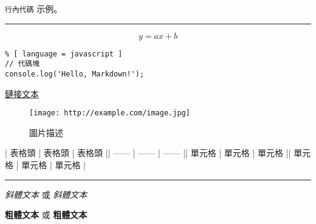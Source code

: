 \lstinline{行內代碼} 示例。

\vspace{5pt}
\hrule
\vspace{6pt}

\begin{equation}
y = ax+b
\end{equation}

\begin{lstlisting}% [ language = javascript ]
// 代碼塊
console.log('Hello, Markdown!');
\end{lstlisting}

\href{http://example.com}{鏈接文本}

\begin{figure}[htbp]
\texttt{[image: http://example.com/image.jpg]}
\caption{圖片描述}
\end{figure}

| 表格頭 | 表格頭 | 表格頭 || ------ | ------ | ------ || 單元格 | 單元格 | 單元格 || 單元格 | 單元格 | 單元格 |

\vspace{5pt}
\hrule
\vspace{6pt}

\textit{斜體文本} 或 \textit{斜體文本}

\textbf{粗體文本} 或 \textbf{粗體文本}

